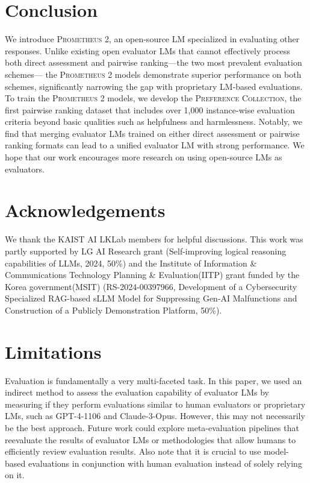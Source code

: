 \documentclass[11pt]{article}
\begin{document}
\section{Conclusion}
We introduce \textsc{Prometheus 2}, an open-source LM specialized in evaluating other responses. Unlike existing open evaluator LMs that cannot effectively process both direct assessment and pairwise ranking—the two most prevalent evaluation schemes— the \textsc{Prometheus 2} models demonstrate superior performance on both schemes, significantly narrowing the gap with proprietary LM-based evaluations. To train the \textsc{Prometheus 2} models, we develop the \textsc{Preference Collection}, the first pairwise ranking dataset that includes over 1,000 instance-wise evaluation criteria beyond basic qualities such as helpfulness and harmlessness. Notably, we find that merging evaluator LMs trained on either direct assessment or pairwise ranking formats can lead to a unified evaluator LM with strong performance. We hope that our work encourages more research on using open-source LMs as evaluators.

\section*{Acknowledgements}
We thank the KAIST AI LKLab members for helpful discussions. This work was partly supported by LG AI Research grant (Self-improving logical reasoning capabilities of LLMs, 2024, 50\%) and the Institute of Information \& Communications Technology Planning \& Evaluation(IITP) grant funded by the Korea government(MSIT) (RS-2024-00397966, Development of a Cybersecurity Specialized RAG-based sLLM Model for Suppressing Gen-AI Malfunctions and Construction of a Publicly Demonstration Platform, 50\%).


\section*{Limitations}
Evaluation is fundamentally a very multi-faceted task. In this paper, we used an indirect method to assess the evaluation capability of evaluator LMs by measuring if they perform evaluations similar to human evaluators or proprietary LMs, such as GPT-4-1106 and Claude-3-Opus. However, this may not necessarily be the best approach. Future work could explore meta-evaluation pipelines that reevaluate the results of evaluator LMs or methodologies that allow humans to efficiently review evaluation results. Also note that it is crucial to use model-based evaluations in conjunction with human evaluation instead of solely relying on it.
\end{document}
